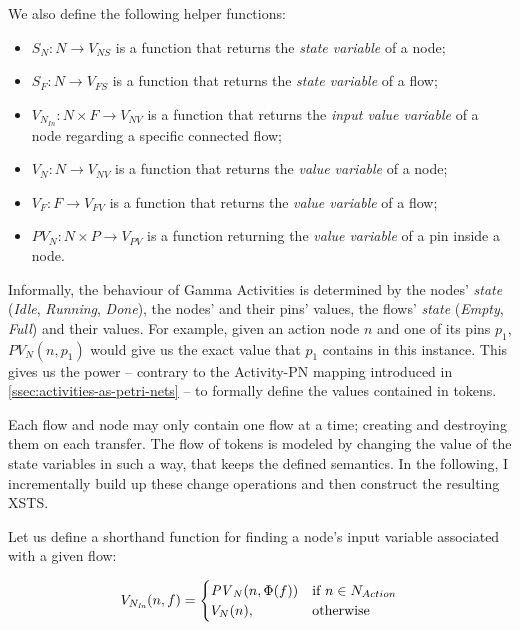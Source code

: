 We also define the following helper functions:

\begin{itemize}
	\item \(S_N : N \rightarrow V_\mathit{NS} \) is a function that returns the \emph{state variable} of a node;
	\item \(S_F : N \rightarrow V_\mathit{FS} \) is a function that returns the \emph{state variable} of a flow;
	\item \(V_{N_\mathit{In}} : N \times F \rightarrow V_\mathit{NV} \) is a function that returns the \emph{input value variable} of a node regarding a specific connected flow;
	\item \(V_N : N \rightarrow V_\mathit{NV} \) is a function that returns the \emph{value variable} of a node;
	\item \(V_F : F \rightarrow V_\mathit{FV} \) is a function that returns the \emph{value variable} of a flow;
	\item \(\mathit{PV}_N : N \times P \rightarrow V_\mathit{PV} \) is a function returning the \emph{value variable} of a pin inside a node.
\end{itemize}

Informally, the behaviour of Gamma Activities is determined by the nodes' \emph{state} (\emph{Idle}, \emph{Running}, \emph{Done}), the nodes' and their pins' values, the flows' \emph{state} (\emph{Empty}, \emph{Full}) and their values. For example, given an action node \(n\) and one of its pins \(p_1\), \(\mathit{PV}_N(n, p_1)\) would give us the exact value that \(p_1\) contains in this instance. This gives us the power -- contrary to the Activity-PN mapping introduced in \autoref{ssec:activities-as-petri-nets} -- to formally define the values contained in tokens.

Each flow and node may only contain one flow at a time; creating and destroying them on each transfer. The flow of tokens is modeled by changing the value of the state variables in such a way, that keeps the defined semantics. In the following, I incrementally build up these change operations and then construct the resulting XSTS. 

Let us define a shorthand function for finding a node's input variable associated with a given flow:

\begin{equation*}
	V_{N_\mathit{In}}(n, f) = 
	\begin{cases}
		\mathit{PV}_N(n, \Phi(f)) & \text{if } n \in N_{Action} \\
		V_N(n), & \text{otherwise}
	\end{cases}
\end{equation*}


